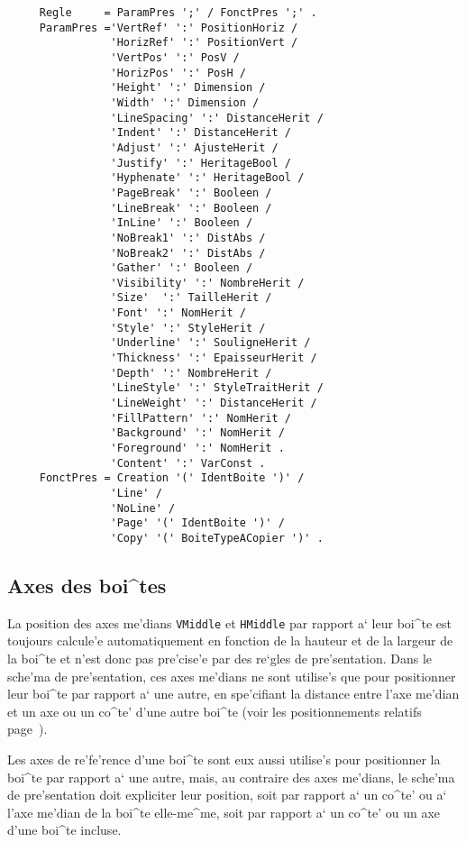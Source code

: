 {\begin{verbatim}
     Regle     = ParamPres ';' / FonctPres ';' .
     ParamPres ='VertRef' ':' PositionHoriz /
                'HorizRef' ':' PositionVert /
                'VertPos' ':' PosV /
                'HorizPos' ':' PosH /
                'Height' ':' Dimension /
                'Width' ':' Dimension /
                'LineSpacing' ':' DistanceHerit /
                'Indent' ':' DistanceHerit /
                'Adjust' ':' AjusteHerit /
                'Justify' ':' HeritageBool /
                'Hyphenate' ':' HeritageBool /
                'PageBreak' ':' Booleen /
                'LineBreak' ':' Booleen /
                'InLine' ':' Booleen /
                'NoBreak1' ':' DistAbs /
                'NoBreak2' ':' DistAbs /
                'Gather' ':' Booleen /
                'Visibility' ':' NombreHerit /
                'Size'  ':' TailleHerit /
                'Font' ':' NomHerit /
                'Style' ':' StyleHerit /
                'Underline' ':' SouligneHerit /
                'Thickness' ':' EpaisseurHerit /
                'Depth' ':' NombreHerit /
                'LineStyle' ':' StyleTraitHerit /
                'LineWeight' ':' DistanceHerit /
                'FillPattern' ':' NomHerit /
                'Background' ':' NomHerit /
                'Foreground' ':' NomHerit .
                'Content' ':' VarConst .
     FonctPres = Creation '(' IdentBoite ')' /
                'Line' /
                'NoLine' /
                'Page' '(' IdentBoite ')' /
                'Copy' '(' BoiteTypeACopier ')' .
\end{verbatim}

\subsection{Axes des boi^tes}

La position des axes me'dians {\tt VMiddle} et {\tt HMiddle} par rapport a`
leur boi^te est toujours calcule'e automatiquement en fonction de la hauteur
et de la largeur de la boi^te et n'est donc pas pre'cise'e
par des re`gles de pre'sentation. Dans le sche'ma de pre'sentation, ces axes
me'dians ne sont utilise's que pour positionner leur boi^te par
rapport a` une autre, en spe'cifiant la distance entre l'axe me'dian et
un axe ou un co^te' d'une autre boi^te (voir les positionnements relatifs
page~\pageref{position}).

Les axes de re'fe'rence d'une boi^te sont eux aussi utilise's
pour positionner la boi^te par rapport a` une autre, mais, au contraire
des axes me'dians, le sche'ma de pre'sentation doit expliciter leur position,
soit par rapport a` un co^te' ou a` l'axe me'dian de la boi^te elle-me^me,
soit par rapport a` un co^te' ou un axe d'une boi^te incluse.

}
